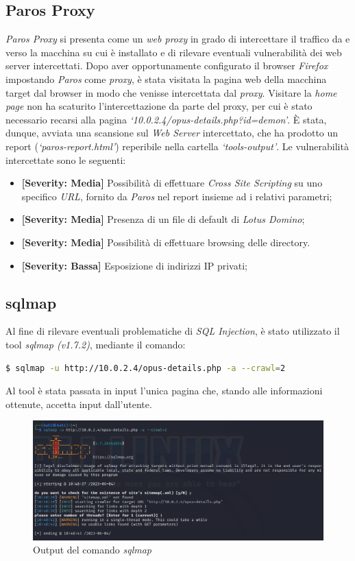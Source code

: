 \subsection{Paros Proxy}
\emph{Paros Proxy} si presenta come un \emph{web proxy} in grado di intercettare il traffico da e verso la macchina su cui è installato e di rilevare eventuali vulnerabilità dei web server intercettati. Dopo aver opportunamente configurato il browser \emph{Firefox} impostando \emph{Paros} come \emph{proxy}, è stata visitata la pagina web della macchina target dal browser in modo che venisse intercettata dal \emph{proxy}. Visitare la \emph{home page} non ha scaturito l'intercettazione da parte del proxy, per cui è stato necessario recarsi alla pagina \emph{`10.0.2.4/opus-details.php?id=demon'}. È stata, dunque, avviata una scansione sul \emph{Web Server} intercettato, che ha prodotto un report (\emph{`paros-report.html'}) reperibile nella cartella \emph{`tools-output'}. Le vulnerabilità intercettate sono le seguenti:
\begin{itemize}
    \item \textbf{[Severity: Media]} Possibilità di effettuare \emph{Cross Site Scripting} su uno specifico \emph{URL}, fornito da \emph{Paros} nel report insieme ad i relativi parametri;
    \item \textbf{[Severity: Media]} Presenza di un file di default di \emph{Lotus Domino};
    \item \textbf{[Severity: Media]} Possibilità di effettuare browsing delle directory.
    \item \textbf{[Severity: Bassa]} Esposizione di indirizzi IP privati;
\end{itemize} 
\subsection{sqlmap}
Al fine di rilevare eventuali problematiche di \emph{SQL Injection}, è stato utilizzato il tool \emph{sqlmap (v1.7.2)}, mediante il comando:
\begin{lstlisting}[language=bash]
    $ sqlmap -u http://10.0.2.4/opus-details.php -a --crawl=2
\end{lstlisting}
Al tool è stata passata in input l'unica pagina che, stando alle informazioni ottenute, accetta input dall'utente.
\begin{figure}[h]
    \centering
    \includegraphics[scale=0.5]{capitoli/images/sqlmap.png}
    \caption{Output del comando \emph{sqlmap}}
    \label{fig:sqlmap}
\end{figure}

